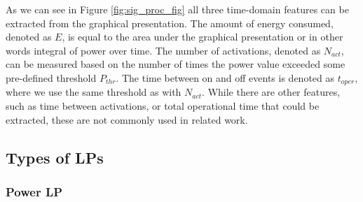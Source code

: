 As we can see in Figure \ref{fig:sig_proc_fig} all three time-domain features can be extracted from the graphical presentation.
The amount of energy consumed, denoted as $E$, is equal to the area under the graphical presentation or in other words integral of power over time. 
The number of activations, denoted as $N_{act}$, can be measured based on the number of times the power value exceeded some pre-defined threshold $P_{thr}$. 
The time between on and off events is denoted as $t_{oper}$, where we use the same threshold as with $N_{act}$.
While there are other features, such as time between activations, or total operational time that could be
extracted, these are not commonly used in related work.




\subsection{Types of LPs} 

\subsubsection{Power LP}
\label{ssec:feature_set}

